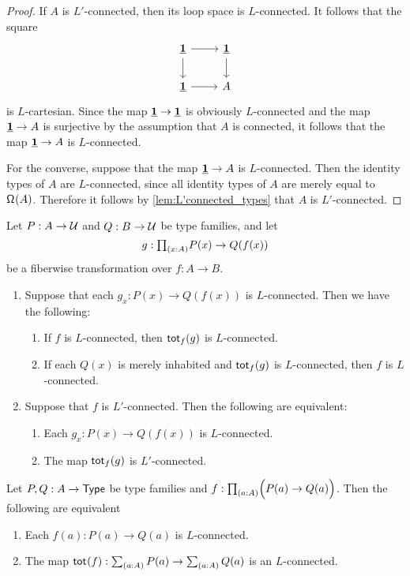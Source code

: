 \begin{proof}
If $A$ is $L'$-connected, then its loop space is $L$-connected. It follows that the square
\begin{equation*}
\begin{tikzcd}
\unit \arrow[r] \arrow[d] & \unit \arrow[d] \\
\unit \arrow[r] & A
\end{tikzcd}
\end{equation*}
is $L$-cartesian. Since the map $\unit\to\unit$ is obviously $L$-connected and the map $\unit\to A$ is surjective by the assumption that $A$ is connected, it follows that the map $\unit\to A$ is $L$-connected.

For the converse, suppose that the map $\unit\to A$ is $L$-connected. Then the identity types of $A$ are $L$-connected, since all identity types of $A$ are merely equal to $\loopspace{A}$. Therefore it follows by \cref{lem:L'connected_types} that $A$ is $L'$-connected.
\end{proof}

\begin{cor}\label{lem:nconnected_postcomp_variation}
Let $P:A\to\UU$ and $Q:B\to\UU$ be type families, and let
\begin{equation*}
g:\prd{x:A}P(x)\to Q(f(x))
\end{equation*}
be a fiberwise transformation over $f:A\to B$.
\begin{enumerate}
\item Suppose that each $g_x:P(x)\to Q(f(x))$ is $L$-connected. Then we have the following:
\begin{enumerate}
\item If $f$ is $L$-connected, then $\total[f]{g}$ is $L$-connected.
\item If each $Q(x)$ is merely inhabited and $\total[f]{g}$ is $L$-connected, then $f$ is $L$-connected.
\end{enumerate}
\item Suppose that $f$ is $L'$-connected. Then the following are equivalent:
\begin{enumerate}
\item Each $g_x:P(x)\to Q(f(x))$ is $L$-connected.
\item The map $\total[f]{g}$ is $L'$-connected.
\end{enumerate}  
\end{enumerate}
\end{cor}

\begin{prp}\label{prop:nconn_fiber_to_total}
Let $P,Q:A\to\type$ be type families and $f:\prd{a:A} \Parens{P(a)\to Q(a)}$. Then the following are equivalent
\begin{enumerate}
\item Each $f(a):P(a)\to Q(a)$ is $L$-connected.
\item The map $\total{f}: \sm{a:A}P(a) \to \sm{a:A} Q(a)$ is an $L$-connected.
\end{enumerate}
\end{prp}

